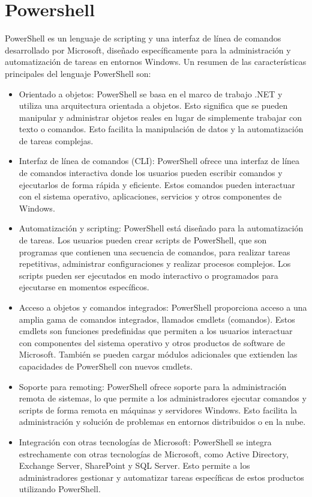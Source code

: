 \documentclass[a4paper, 12pt]{book}
\begin{document}
\section{Powershell}
\label{sec:Powershell}

PowerShell es un lenguaje de scripting y una interfaz de línea de comandos desarrollado por Microsoft, diseñado específicamente para la administración y automatización de tareas en entornos Windows. Un resumen de las características principales del lenguaje PowerShell son:

\begin{itemize}

\item Orientado a objetos: PowerShell se basa en el marco de trabajo .NET y utiliza una arquitectura orientada a objetos. Esto significa que se pueden manipular y administrar objetos reales en lugar de simplemente trabajar con texto o comandos. Esto facilita la manipulación de datos y la automatización de tareas complejas.

\item Interfaz de línea de comandos (CLI): PowerShell ofrece una interfaz de línea de comandos interactiva donde los usuarios pueden escribir comandos y ejecutarlos de forma rápida y eficiente. Estos comandos pueden interactuar con el sistema operativo, aplicaciones, servicios y otros componentes de Windows.

\item Automatización y scripting: PowerShell está diseñado para la automatización de tareas. Los usuarios pueden crear scripts de PowerShell, que son programas que contienen una secuencia de comandos, para realizar tareas repetitivas, administrar configuraciones y realizar procesos complejos. Los scripts pueden ser ejecutados en modo interactivo o programados para ejecutarse en momentos específicos.

\item Acceso a objetos y comandos integrados: PowerShell proporciona acceso a una amplia gama de comandos integrados, llamados cmdlets (comandos). Estos cmdlets son funciones predefinidas que permiten a los usuarios interactuar con componentes del sistema operativo y otros productos de software de Microsoft. También se pueden cargar módulos adicionales que extienden las capacidades de PowerShell con nuevos cmdlets.

\item Soporte para remoting: PowerShell ofrece soporte para la administración remota de sistemas, lo que permite a los administradores ejecutar comandos y scripts de forma remota en máquinas y servidores Windows. Esto facilita la administración y solución de problemas en entornos distribuidos o en la nube.

\item Integración con otras tecnologías de Microsoft: PowerShell se integra estrechamente con otras tecnologías de Microsoft, como Active Directory, Exchange Server, SharePoint y SQL Server. Esto permite a los administradores gestionar y automatizar tareas específicas de estos productos utilizando PowerShell.
\end{itemize}
\end{document}
